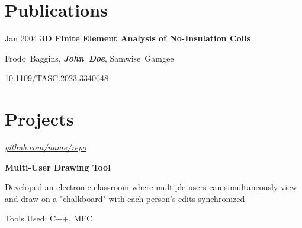 \documentclass[10pt, letterpaper]{article}
\begin{document}
    
    \section{Publications}



        
        \begin{samepage}
            \begin{twocolentry}{
                Jan 2004
            }
                \textbf{3D Finite Element Analysis of No-Insulation Coils}

                \vspace{0.10 cm}

                \mbox{Frodo Baggins}, \mbox{\textbf{\textit{John Doe}}}, \mbox{Samwise Gamgee}
            \end{twocolentry}


            \vspace{0.10 cm}

            \begin{onecolentry}
        \href{https://doi.org/10.1109/TASC.2023.3340648}{10.1109/TASC.2023.3340648}
            \end{onecolentry}
        \end{samepage}


    
    \section{Projects}



        
        \begin{twocolentry}{
            
            
        \textit{\href{https://github.com/sinaatalay/rendercv}{github.com/name/repo}}}
            \textbf{Multi-User Drawing Tool}
        \end{twocolentry}

        \vspace{0.10 cm}
        \begin{onecolentry}
            \begin{highlights}
                \item Developed an electronic classroom where multiple users can simultaneously view and draw on a "chalkboard" with each person's edits synchronized
                \item Tools Used: C++, MFC
            \end{highlights}
        \end{onecolentry}
\end{document}
